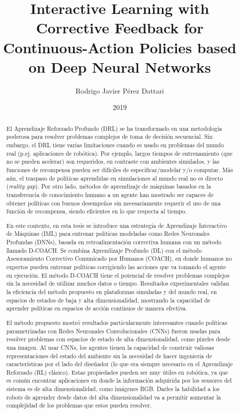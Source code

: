 \documentclass[upright, contnum]{umemoria}
\author{Rodrigo Javier Pérez Dattari}
\title{Interactive Learning with Corrective Feedback for Continuous-Action Policies based on Deep Neural Networks}
\date{2019}
\begin{document}
\frontmatter
\maketitle

\begin{abstract}
El Aprendizaje Reforzado Profundo (DRL) se ha transformado en una metodología poderosa para resolver problemas complejos de toma de decisión secuencial. Sin embargo, el DRL tiene varias limitaciones cuando es usado en problemas del mundo real (p.ej. aplicaciones de robótica). Por ejemplo, largos tiempos de entrenamiento (que no se pueden acelerar) son requeridos, en contraste con ambientes simulados, y las funciones de recompensa pueden ser difíciles de especificar/modelar y/o computar. Más aún, el traspaso de políticas aprendidas en simulaciones al mundo real no es directo (\emph{reality gap}). Por otro lado, métodos de aprendizaje de máquinas basados en la transferencia de conocimiento humano a un agente han mostrado ser capaces de obtener políticas con buenos desempeños sin necesariamente requerir el uso de una función de recompensa, siendo eficientes en lo que respecta al tiempo.

En este contexto, en esta tesis se introduce una estrategia de Aprendizaje Interactivo de Máquinas (IML) para entrenar políticas modeladas como Redes Neuronales Profundas (DNNs), basada en retroalimentación correctiva humana con un método llamado D-COACH. Se combina Aprendizaje Profundo (DL) con el método Asesoramiento Correctivo Comunicado por Humanos (COACH), en donde humanos no expertos pueden entrenar políticas corrigiendo las acciones que va tomando el agente en ejecución. El método D-COACH tiene el potencial de resolver problemas complejos sin la necesidad de utilizar muchos datos o tiempo. Resultados experimentales validan la eficiencia del método propuesto en plataformas simuladas y del mundo real, en espacios de estados de baja y alta dimensionalidad, mostrando la capacidad de aprender políticas en espacios de acción continuos de manera efectiva.

El método propuesto mostró resultados particularmente interesantes cuando políticas parametrizadas con Redes Neuronales Convolucionales (CNNs) fueron usadas para resolver problemas con espacios de estado de alta dimensionalidad, como pixeles desde una imagen. Al usar CNNs, los agentes tienen la capacidad de construir valiosas representaciones del estado del ambiente sin la necesidad de hacer ingeniería de características por el lado del diseñador (lo que era siempre necesario en el Aprendizaje Reforzado (RL) clásico). Estas propiedades pueden ser muy útiles en robótica, ya que es común encontrar aplicaciones en donde la información adquirida por los sensores del sistema es de alta dimensionalidad, como imágenes RGB. Darles la habilidad a los robots de aprender desde datos del alta dimensionalidad va a permitir aumentar la complejidad de los problemas que estos pueden resolver.


\end{abstract}
\end{document}
